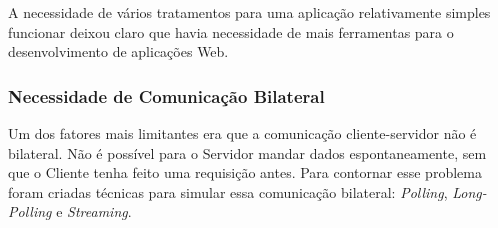 \documentclass[a4paper,12pt]{article}
\begin{document}
A necessidade de vários tratamentos para uma aplicação relativamente simples funcionar deixou claro que havia necessidade de mais ferramentas para o desenvolvimento de aplicações Web.


\subsubsection{Necessidade de Comunicação Bilateral}

Um dos fatores mais limitantes era que a comunicação cliente-servidor não é bilateral. Não é possível para o Servidor mandar dados espontaneamente, sem que o Cliente tenha feito uma requisição antes. Para contornar esse problema foram criadas técnicas para simular essa comunicação bilateral: \emph{Polling}, \emph{Long-Polling} e \emph{Streaming}.
\end{document}
